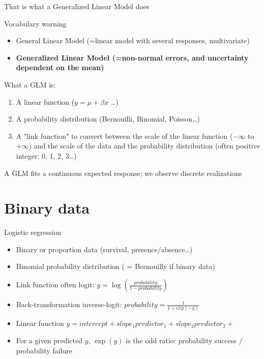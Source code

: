\documentclass{beamer}
\begin{document}
\begin{frame}{That is what a Generalized Linear Model does}

\begin{block}{Vocabulary warning}
  \begin{itemize}
    \item General Linear Model (=linear model with several responses, multivariate)
    \item \textbf{Generalized Linear Model (=non-normal errors, and uncertainty dependent on the mean)} 
  \end{itemize}
\end{block}

\pause

\begin{block}{What a GLM is:}
  \begin{enumerate}
    \item A linear function ($y = \mu + \beta x$ \dots)
    \item A probability distribution (Bernouilli, Binomial, Poisson\dots)
    \item A "link function" to convert between the scale of the linear function ($-\infty$ to $+\infty$) and the scale of the data and the probability distribution (often positive integer: 0, 1, 2, 3\dots)
  \end{enumerate}
  A GLM fits a continuous expected response; we observe discrete realizations
\end{block}

\end{frame}


\section{Binary data}

\begin{frame}{Logistic regression}

  \begin{block}{}
   
\begin{itemize}[<+->]
    \item Binary or proportion data (survival, presence/absence\dots)
    \item Binomial probability distribution ( = Bernouilly if binary data)
    \item Link function often logit: $y=\log(\frac{probability}{1-probability})$
    \item Back-transformation inverse-logit: $probability = \frac{1}{1 + exp(-y)}$
    \item Linear function $y = intercept + slope_1 predictor_1 + slope_2 predictor_2 +$
    \item For a given predicted $y$, $\exp(y)$ is the odd ratio: probability success / probability failure
  \end{itemize}
  
  
  \end{block}

  \end{frame}
  
\end{document}
